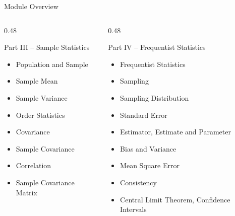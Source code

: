 \documentclass[aspectratio=169,12pt]{beamer}
\begin{document}

\begin{frame}{Module Overview}

\begin{columns}[T,totalwidth=\textwidth]

\begin{column}{0.48\textwidth}

\begin{block}{Part III -- Sample Statistics}

\begin{itemize}
    \item Population and Sample
    \item Sample Mean
    \item Sample Variance
    \item Order Statistics
    \item Covariance
    \item Sample Covariance
    \item Correlation
    \item Sample Covariance Matrix
\end{itemize}

\end{block}

\end{column}

\begin{column}{0.48\textwidth}

\begin{block}{Part IV -- Frequentist Statistics}

\begin{itemize}
    \item Frequentist Statistics
    \item Sampling
    \item Sampling Distribution
    \item Standard Error
    \item Estimator, Estimate and Parameter
    \item Bias and Variance
    \item Mean Square Error
    \item Consistency
    \item Central Limit Theorem, Confidence Intervals
\end{itemize}

\end{block}

\end{column}

\end{columns}

\end{frame}
\end{document}
